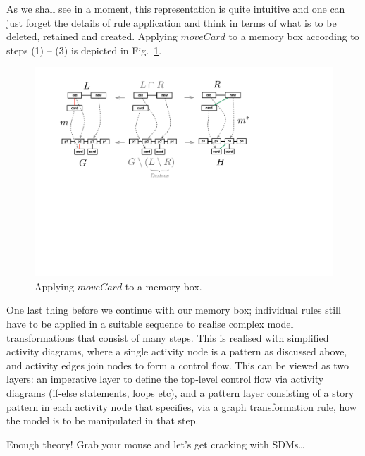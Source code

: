  As we shall see in a moment, this  representation is quite intuitive and one can
just forget the details of rule application and think in terms of what is to be
deleted, retained and created. Applying $moveCard$ to a memory box according to
steps (1) -- (3) is depicted in Fig.~\ref{fig:rule_app_example}.

\begin{figure}[htp] 
\begin{center}
  \includegraphics[width=\textwidth]{pics/installationAndSetup/rule_app_example}
  \caption[]{Applying $moveCard$ to a memory box.}
  \label{fig:rule_app_example}
\end{center}
\end{figure}

\clearpage 

One last thing before we continue with our memory box; individual rules still
have to be applied in a suitable sequence to realise complex model
transformations that consist of many steps.  This is realised with simplified
activity diagrams, where a single activity node is a pattern as discussed above,
and activity edges join nodes to form a control flow.   This can be viewed as
two layers:  an imperative layer to define the top-level control flow via
activity diagrams (if-else statements, loops etc), and a pattern layer
consisting of a story pattern in each activity node that specifies, via a graph
transformation rule, how the model is to be manipulated in that step.         

Enough theory! Grab your mouse and let's get cracking with SDMs\ldots